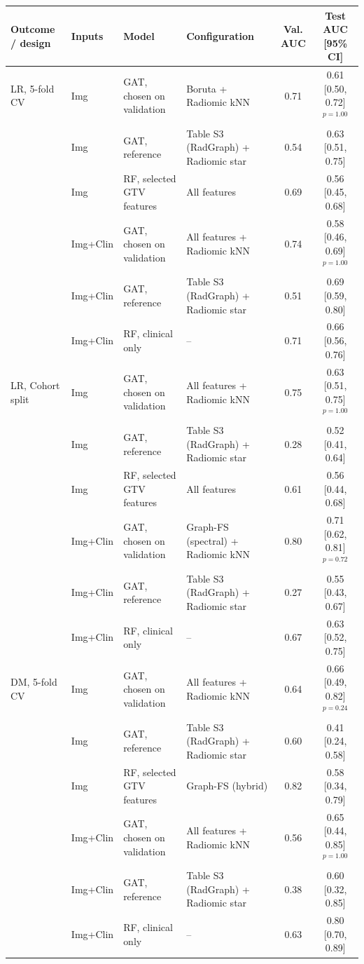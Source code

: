 \begin{tabular}{@{}llllcc@{}}
\toprule
Outcome / design & Inputs & Model & Configuration & Val. AUC & Test AUC [95\% CI] \\
\midrule
LR, 5-fold CV & Img & GAT, chosen on validation & Boruta + Radiomic kNN & 0.71 & 0.61 [0.50, 0.72]$^{p=1.00}$ \\
 & Img & GAT, reference & Table S3 (RadGraph) + Radiomic star & 0.54 & 0.63 [0.51, 0.75] \\
 & Img & RF, selected GTV features & All features & 0.69 & 0.56 [0.45, 0.68] \\
 & Img+Clin & GAT, chosen on validation & All features + Radiomic kNN & 0.74 & 0.58 [0.46, 0.69]$^{p=1.00}$ \\
 & Img+Clin & GAT, reference & Table S3 (RadGraph) + Radiomic star & 0.51 & 0.69 [0.59, 0.80] \\
 & Img+Clin & RF, clinical only & -- & 0.71 & 0.66 [0.56, 0.76] \\
\addlinespace
LR, Cohort split & Img & GAT, chosen on validation & All features + Radiomic kNN & 0.75 & 0.63 [0.51, 0.75]$^{p=1.00}$ \\
 & Img & GAT, reference & Table S3 (RadGraph) + Radiomic star & 0.28 & 0.52 [0.41, 0.64] \\
 & Img & RF, selected GTV features & All features & 0.61 & 0.56 [0.44, 0.68] \\
 & Img+Clin & GAT, chosen on validation & Graph-FS (spectral) + Radiomic kNN & 0.80 & 0.71 [0.62, 0.81]$^{p=0.72}$ \\
 & Img+Clin & GAT, reference & Table S3 (RadGraph) + Radiomic star & 0.27 & 0.55 [0.43, 0.67] \\
 & Img+Clin & RF, clinical only & -- & 0.67 & 0.63 [0.52, 0.75] \\
\midrule
DM, 5-fold CV & Img & GAT, chosen on validation & All features + Radiomic kNN & 0.64 & 0.66 [0.49, 0.82]$^{p=0.24}$ \\
 & Img & GAT, reference & Table S3 (RadGraph) + Radiomic star & 0.60 & 0.41 [0.24, 0.58] \\
 & Img & RF, selected GTV features & Graph-FS (hybrid) & 0.82 & 0.58 [0.34, 0.79] \\
 & Img+Clin & GAT, chosen on validation & All features + Radiomic kNN & 0.56 & 0.65 [0.44, 0.85]$^{p=1.00}$ \\
 & Img+Clin & GAT, reference & Table S3 (RadGraph) + Radiomic star & 0.38 & 0.60 [0.32, 0.85] \\
 & Img+Clin & RF, clinical only & -- & 0.63 & 0.80 [0.70, 0.89] \\

\end{tabular}
